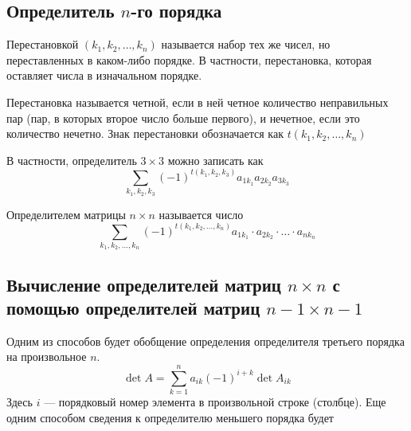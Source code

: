 \documentclass[12pt, a4paper]{article}
\begin{document}
    \subsection{Определитель \texorpdfstring{\( n \)}{n}-го порядка}
    \begin{definition}
        Перестановкой \( (k_{1}, k_{2}, \ldots , k_{n}) \) называется набор тех же чисел, но переставленных в каком-либо порядке. В частности, перестановка, которая оставляет числа в изначальном порядке.
    \end{definition}
    \begin{definition}
        Перестановка называется четной, если в ней четное количество неправильных пар (пар, в которых второе число больше первого), и нечетное, если это количество нечетно. Знак перестановки обозначается как \( t(k_{1}, k_{2}, \ldots , k_{n}) \)
    \end{definition}
    В частности, определитель \( 3 \times 3 \) можно записать как \[
        \sum_{k_{1}, k_{2}, k_{3}} (-1)^{t(k_{1},k_{2},k_{3})} a_{1 k_1}a_{2 k_{2}} a_{3k_{3}} 
    \] 
    \begin{definition}
        Определителем матрицы \( n \times n \) называется число \[
            \sum_{k_{1}, k_{2}, \ldots, k_{n}} (-1)^{t(k_{1}, k_{2}, \ldots, k_{n})} a_{1 k_{1}} \cdot a_{2 k_{2}} \cdot \ldots \cdot a_{n k_{n}} 
        \] 
    \end{definition}
    \subsection{Вычисление определителей матриц \texorpdfstring{\( n\times n \)}{n x n} с помощью определителей матриц \texorpdfstring{\( n-1\times n-1 \)}{n-1 x n-1}}

    Одним из способов будет обобщение определения определителя третьего порядка на произвольное \( n \). \[
        \det A = \sum_{k=1}^{n} a_{ik}(-1)^{i + k} \det A_{ik} 
    \]Здесь \( i \) --- порядковый номер элемента в произвольной строке (столбце). 
    Еще одним способом сведения к определителю меньшего порядка будет 
\end{document}
